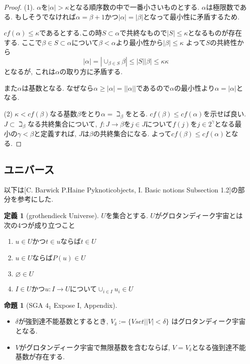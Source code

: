 \documentclass[dvipdfmx,a4paper,11pt]{report}
\theoremstyle{definition}
\newtheorem{prop}[thm]{命題}
\newtheorem{dfn}[thm]{定義}
\begin{document}
\begin{proof}
(1). $\alpha$を$|\alpha|>\kappa$となる順序数の中で一番小さいものとする.
$\alpha$は極限数である. もしそうでなければ$\alpha = \beta +1$かつ$|\alpha|=|\beta|$となって最小性に矛盾するため.

$cf(\alpha) \le \kappa$であるとする.この時$S \subset \alpha$で共終なもので$|S| \le \kappa$となるものが存在する.
ここで$\beta \in S \subset \alpha$について$\beta < \alpha$より最小性から$|\beta| \le \kappa$
よって$S$の共終性から
$$
|\alpha|
=
|\cup_{\beta \in S}\beta|
\le 
|S| |\beta|
\le
\kappa \kappa
$$ 
となるが, これは$\alpha$の取り方に矛盾する.

また$\alpha$は基数となる. 
なぜなら$\alpha\ge |\alpha| = || \alpha||$であるので$\alpha$の最小性より$\alpha =|\alpha| $となる. 

(2)
$\kappa < cf(\beta)$なる基数$\beta$をとり$\alpha = \beth_{\beta}$をとる.
$cf(\beta) \le cf(\alpha )$を示せば良い.
$J \subset \beth_{\beta}$なる共終集合について, $f: J \to \beta$を$j \in J$について$f(j)$を$j \in 2^{\gamma}$となる最小の$\gamma < \beta$と定義すれば, $J$は$\beta$の共終集合になる. 
よって$cf(\beta) \le cf(\alpha )$となる. 

\end{proof}

\subsection{ユニバース}
以下は[C. Barwick P.Haine Pyknoticobjects, I. Basic notions Subsection 1.2]の部分を参考にした. 

 \begin{tcolorbox}
 [colback = white, colframe = green!35!black, fonttitle = \bfseries,breakable = true]
\begin{dfn}[grothendieck Universe]
$U$を集合とする. $U$がグロタンディーク宇宙とは次の4つが成り立つこと
\begin{enumerate}
\item $u \in U$かつ$t \in u$ならば$t \in U$
\item $u \in U$ならば$P(u) \in U$
\item $\varnothing \in U$
\item $I \in U$かつ$u : I \to U$について$\cup_{i \in I} u_i \in U$
\end{enumerate}
\end{dfn}
\end{tcolorbox}

 \begin{tcolorbox}
 [colback = white, colframe = green!35!black, fonttitle = \bfseries,breakable = true]
\begin{prop}[SGA $4_1$ Expose I, Appendix]
\begin{itemize}
\item $\delta$が強到達不能基数とするとき, 
$V_{\delta} := \{ V set |  |V| < \delta\}$
はグロタンディーク宇宙となる.
\item $V$がグロタンディーク宇宙で無限基数を含むならば, $V = V_{\delta}$となる強到達不能基数が存在する.
\end{itemize}
\end{prop}
\end{tcolorbox}
\end{document}
